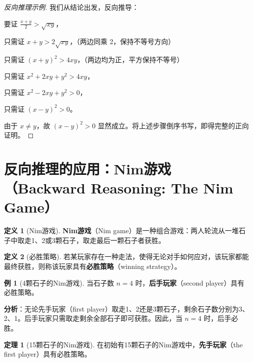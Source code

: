 \documentclass[UTF8,11pt,a4paper]{ctexbook}   %
\theoremstyle{definition}
\newtheorem{definition}{定义}[section]
\newtheorem{theorem}{定理}[section]
\newtheorem{example}{例}[section]
\begin{document}
\begin{proof}[反向推理示例]
我们从结论出发，反向推导：

要证 $\displaystyle\frac{x+y}{2} > \sqrt{xy}$，

只需证 $x+y > 2\sqrt{xy}$，（两边同乘 2，保持不等号方向）

只需证 $(x+y)^2 > 4xy$，（两边均为正，平方保持不等号）

只需证 $x^2 + 2xy + y^2 > 4xy$，

只需证 $x^2 - 2xy + y^2 > 0$，

只需证 $(x-y)^2 > 0$。

由于 $x \neq y$，故 $(x-y)^2 > 0$ 显然成立。将上述步骤倒序书写，即得完整的正向证明。
\end{proof}

\section{反向推理的应用：Nim游戏（Backward Reasoning: The Nim Game）}

\begin{definition}[Nim游戏]
\textbf{Nim游戏}（Nim game）是一种组合游戏：两人轮流从一堆石子中取走1、2或3颗石子，取走最后一颗石子者获胜。
\end{definition}

\begin{definition}[必胜策略]
若某玩家存在一种走法，使得无论对手如何应对，该玩家都能最终获胜，则称该玩家具有\textbf{必胜策略}（winning strategy）。
\end{definition}

\begin{example}[4颗石子的Nim游戏]
当石子数 $n=4$ 时，\textbf{后手玩家}（second player）具有必胜策略。

\textbf{分析}：无论先手玩家（first player）取走1、2还是3颗石子，剩余石子数分别为3、2、1。后手玩家只需取走剩余全部石子即可获胜。因此，当 $n=4$ 时，后手必胜。
\end{example}

\begin{theorem}[15颗石子的Nim游戏]
在初始有15颗石子的Nim游戏中，\textbf{先手玩家}（the first player）具有必胜策略。
\end{theorem}
\end{document}

